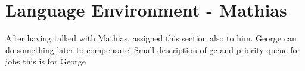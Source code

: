 \section{Language Environment - Mathias}
\label{sect:tech}
After having talked with Mathias, assigned this section also to him.
George can do something later to compensate!
Small description of gc and priority queue for jobs
this is for George
